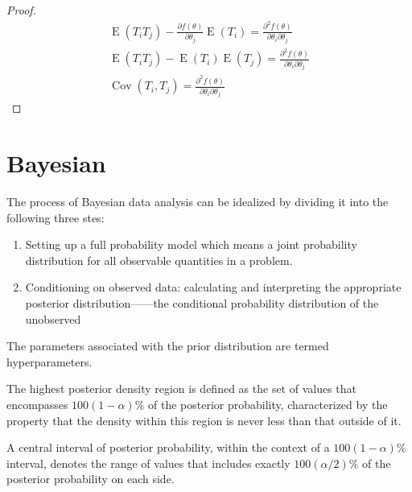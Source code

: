 \begin{proof}
\begin{gather*}
		\operatorname{E}(T_iT_j)-\frac{\partial f(\theta)}{\partial\theta_j}\operatorname{E}(T_i)=\frac{\partial^2 f(\theta)}{\partial\theta_i\partial\theta_j} \\
		\operatorname{E}(T_iT_j)-\operatorname{E}(T_i)\operatorname{E}(T_j)=\frac{\partial^2 f(\theta)}{\partial\theta_i\partial\theta_j} \\
		\operatorname{Cov}(T_i,T_j)=\frac{\partial^2 f(\theta)}{\partial\theta_i\partial\theta_j}
	\end{gather*}
\end{proof}


\section{Bayesian}
The process of Bayesian data analysis can be idealized by dividing it into the following three stes:
\begin{enumerate}
	\item Setting up a full probability model which means a joint probability distribution for all observable quantities in a problem.
	\item  Conditioning on observed data: calculating and interpreting the appropriate posterior distribution——the conditional probability distribution of the unobserved
\end{enumerate}

\begin{theorem}\label{eq:Bayesian}
\end{theorem}

\begin{definition}
	The parameters associated with the prior distribution are termed hyperparameters.
\end{definition}
\begin{definition}
	The highest posterior density region is defined as the set of values that encompasses $100(1-\alpha)\%$ of the posterior probability, characterized by the property that the density within this region is never less than that outside of it. \par
	A central interval of posterior probability, within the context of a $100(1 - \alpha)\%$ interval, denotes the range of values that includes exactly $100(\alpha/2)\%$ of the posterior probability on each side.
\end{definition}

